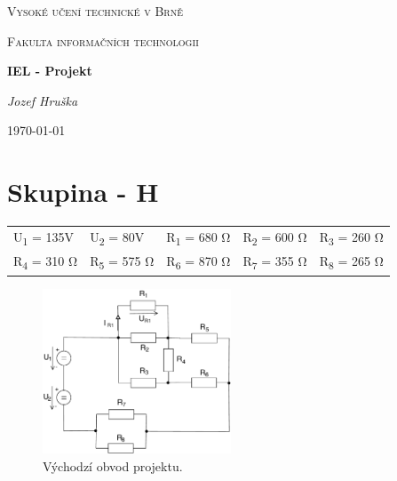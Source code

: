 \documentclass[12pt,a4paper]{article}
\begin{document}
\begin{titlepage}
	\centering
	{\scshape\Large Vysoké učení technické v Brně \par}
	\vspace{0.5cm}
	{\scshape Fakulta informačních technologii \par}
	\vspace{1.5cm}
	{\huge\bfseries IEL - Projekt\par}
	\vspace{2cm}
	{\Large\itshape Jozef Hruška\par}
	\vfill

	{\large \today\par}
\end{titlepage}

\section{Skupina - H}
\begin{tabular}{ l l l l l }
  U\textsubscript{1} = 135V & U\textsubscript{2} = 80V & R\textsubscript{1} = 680 \si{\ohm} & R\textsubscript{2} = 600 \si{\ohm} & R\textsubscript{3} = 260 \si{\ohm} \\
  R\textsubscript{4} = 310 \si{\ohm} & R\textsubscript{5} = 575 \si{\ohm} & R\textsubscript{6} = 870 \si{\ohm} & R\textsubscript{7} = 355 \si{\ohm} & R\textsubscript{8} = 265 \si{\ohm} \\
\end{tabular}

\begin{figure}[h]
\centering
\includegraphics[width=0.5\textwidth]{Circuits/1-A.pdf}
\caption{Východzí obvod projektu.}
\end{figure}
\end{document}
